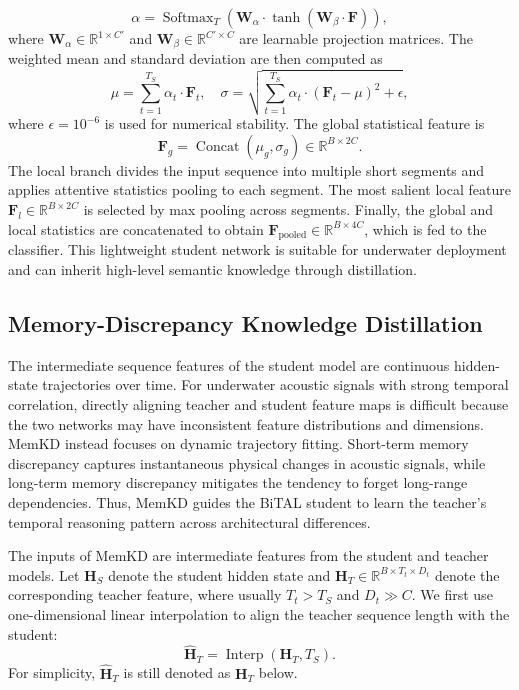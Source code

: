 ﻿\documentclass[lettersize,journal]{IEEEtran}
\begin{document}
\begin{equation}
\alpha = \operatorname{Softmax}_T \left( \mathbf{W}_{\alpha} \cdot \tanh(\mathbf{W}_{\beta} \cdot \mathbf{F}) \right),
\end{equation}
where $\mathbf{W}_{\alpha} \in \mathbb{R}^{1 \times C'}$ and $\mathbf{W}_{\beta} \in \mathbb{R}^{C' \times C}$ are learnable projection matrices. The weighted mean and standard deviation are then computed as
\begin{equation}
\mu = \sum_{t=1}^{T_S} \alpha_t \cdot \mathbf{F}_t, \quad
\sigma = \sqrt{ \sum_{t=1}^{T_S} \alpha_t \cdot (\mathbf{F}_t - \mu)^2 + \epsilon },
\end{equation}
where $\epsilon=10^{-6}$ is used for numerical stability. The global statistical feature is
\begin{equation}
\mathbf{F}_{g}=\operatorname{Concat}(\mu_g,\sigma_g) \in \mathbb{R}^{B \times 2C}.
\end{equation}
The local branch divides the input sequence into multiple short segments and applies attentive statistics pooling to each segment. The most salient local feature $\mathbf{F}_l \in \mathbb{R}^{B \times 2C}$ is selected by max pooling across segments. Finally, the global and local statistics are concatenated to obtain $\mathbf{F}_{\mathrm{pooled}} \in \mathbb{R}^{B \times 4C}$, which is fed to the classifier. This lightweight student network is suitable for underwater deployment and can inherit high-level semantic knowledge through distillation.

\subsection{Memory-Discrepancy Knowledge Distillation}
\label{subsec:memkd}
The intermediate sequence features of the student model are continuous hidden-state trajectories over time. For underwater acoustic signals with strong temporal correlation, directly aligning teacher and student feature maps is difficult because the two networks may have inconsistent feature distributions and dimensions. MemKD instead focuses on dynamic trajectory fitting. Short-term memory discrepancy captures instantaneous physical changes in acoustic signals, while long-term memory discrepancy mitigates the tendency to forget long-range dependencies. Thus, MemKD guides the BiTAL student to learn the teacher's temporal reasoning pattern across architectural differences.

The inputs of MemKD are intermediate features from the student and teacher models. Let $\mathbf{H}_S$ denote the student hidden state and $\mathbf{H}_T \in \mathbb{R}^{B \times T_t \times D_t}$ denote the corresponding teacher feature, where usually $T_t > T_S$ and $D_t \gg C$. We first use one-dimensional linear interpolation to align the teacher sequence length with the student:
\begin{equation}
\hat{\mathbf{H}}_T = \operatorname{Interp}(\mathbf{H}_{T}, T_S).
\end{equation}
For simplicity, $\hat{\mathbf{H}}_T$ is still denoted as $\mathbf{H}_T$ below.
\end{document}
